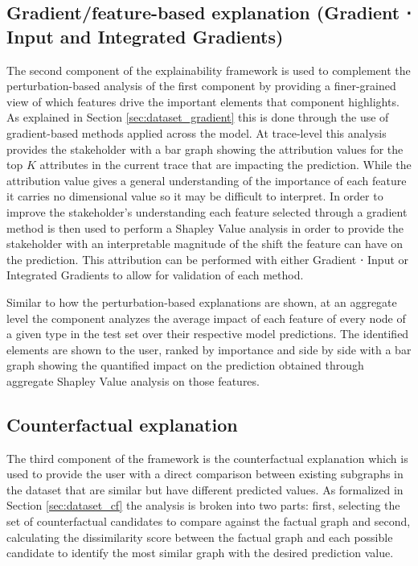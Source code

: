     \subsection{Gradient/feature-based explanation (Gradient ⋅ Input and Integrated Gradients)}
        The second component of the explainability framework is used to complement the perturbation-based analysis of the first component by providing a finer-grained view of which features drive the important elements that component highlights. As explained in Section \ref{sec:dataset_gradient} this is done through the use of gradient-based methods applied across the model.
        At trace-level this analysis provides the stakeholder with a bar graph showing the attribution values for the top $K$ attributes in the current trace that are impacting the prediction. While the attribution value gives a general understanding of the importance of each feature it carries no dimensional value so it may be difficult to interpret. In order to improve the stakeholder's understanding each feature selected through a gradient method is then used to perform a Shapley Value analysis in order to provide the stakeholder with an interpretable magnitude of the shift the feature can have on the prediction. This attribution can be performed with either Gradient ⋅ Input or Integrated Gradients to allow for validation of each method. 

        Similar to how the perturbation-based explanations are shown, at an aggregate level the component analyzes the average impact of each feature of every node of a given type in the test set over their respective model predictions. The identified elements are shown to the user, ranked by importance and side by side with a bar graph showing the quantified impact on the prediction obtained through aggregate Shapley Value analysis on those features.


    \subsection{Counterfactual explanation}
    \label{sec:model_counterfactual}
        The third component of the framework is the counterfactual explanation which is used to provide the user with a direct comparison between existing subgraphs in the dataset that are similar but have different predicted values. As formalized in Section \ref{sec:dataset_cf} the analysis is broken into two parts: first, selecting the set of counterfactual candidates to compare against the factual graph and second, calculating the dissimilarity score between the factual graph and each possible candidate to identify the most similar graph with the desired prediction value.

